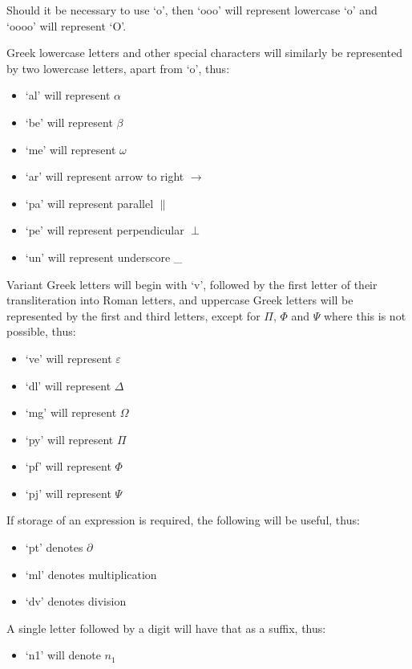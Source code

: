 Should it be necessary to use `o', then `ooo' will represent lowercase
`o' and `oooo' will represent `O'.

Greek lowercase letters and other special characters will similarly be
represented by two lowercase letters, apart from `o', thus:

\begin{itemize}
\item `al' will represent $\alpha$
\item `be' will represent $\beta$
\item `me' will represent $\omega$
\item `ar' will represent arrow to right $\rightarrow$
\item `pa' will represent parallel $\|$
\item `pe' will represent perpendicular $\perp$
\item `un' will represent underscore \_
\end{itemize}

Variant Greek letters will begin with `v', followed by the first letter
of their transliteration into Roman letters, and uppercase Greek letters
will be represented by the first and third letters, except for $\Pi$,
$\Phi$ and $\Psi$ where this is not possible, thus:

\begin{itemize}
\item `ve' will represent $\varepsilon$
\item `dl' will represent $\Delta$
\item `mg' will represent $\Omega$
\item `py' will represent $\Pi$
\item `pf' will represent $\Phi$
\item `pj' will represent $\Psi$
\end{itemize}

If storage of an expression is required, the following will be useful,
thus:

\begin{itemize}
\item `pt' denotes $\partial$
\item `ml' denotes multiplication
\item `dv' denotes division
\end{itemize}

A single letter followed by a digit will have that as a suffix, thus:

\begin{itemize}
\item `n1' will denote $n_1$
\end{itemize}

